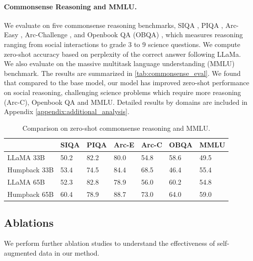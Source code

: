 \paragraph{Commonsense Reasoning and MMLU.} We evaluate on five commonsense reasoning benchmarks, SIQA 
\citep{sap2019socialiqa}, PIQA \citep{bisk2020piqa}, Arc-Easy \citep{clark2018think}, Arc-Challenge \citep{clark2018think}, and Openbook QA (OBQA) \citep{mihaylov2018can}, which measures reasoning ranging from social interactions to grade 3 to 9 science questions. We compute zero-shot accuracy based on perplexity of the correct answer following LLaMa\citep{touvron2023llama}. We also evaluate on the  massive multitask language understanding (MMLU) \citep{hendrycks2020measuring} benchmark. The results are summarized in \autoref{tab:commonsense_eval}. We found that compared to the base model, our model has improved zero-shot performance on social reasoning, challenging science problems which require more reasoning (Arc-C),  Openbook QA and MMLU. Detailed results by domains are included in Appendix \ref{appendix:additional_analysis}.



\begin{table}[h]
  \caption{Comparison on zero-shot commonsense reasoning and MMLU.
  \label{tab:commonsense_eval}
  }
  \centering
  \small
  \begin{tabular}{lllllll}
    \toprule
        & \textbf{SIQA} & \textbf{PIQA}  & \textbf{Arc-E} & \textbf{Arc-C} & \textbf{OBQA} & \textbf{MMLU}  \\
    \midrule
    LLaMA 33B & 50.2  & 82.2 & 80.0 & 54.8 & 58.6 & 49.5 \\
    Humpback 33B & 53.4  & 74.5 & 84.4 & 68.5  & 46.4 & 55.4 \\
    LLaMA 65B & 52.3  & 82.8 & 78.9 & 56.0 & 60.2  & 54.8 \\
    Humpback 65B & 60.4  & 78.9 & 88.7 &  73.0 & 64.0 & 59.0 \\
    \bottomrule
  \end{tabular}
  \vspace{1mm}
\end{table}




\subsection{Ablations}
We perform further ablation studies to understand the effectiveness of self-augmented data in our method. 


